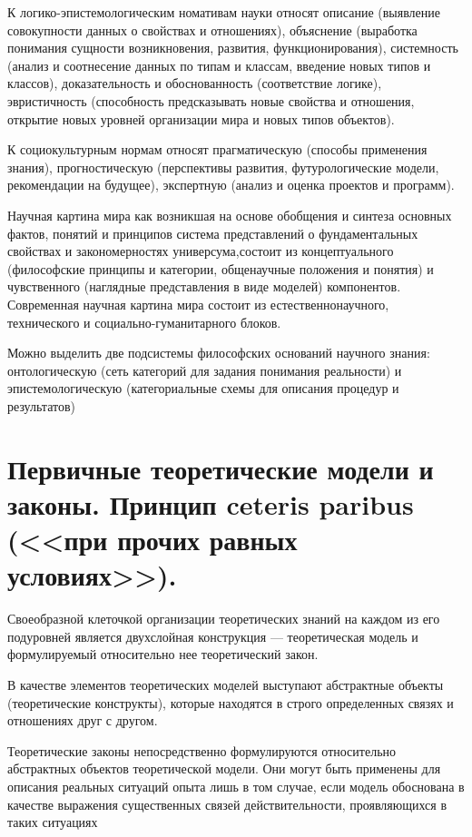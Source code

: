 \documentclass[12pt, specialist, subf, substylefile = spbu.rtx]{disser}
\begin{document}
К логико-эпистемологическим номативам науки относят описание (выявление совокупности данных о свойствах и отношениях), объяснение (выработка понимания сущности возникновения, развития, функционирования), системность (анализ и соотнесение данных по типам и классам, введение новых типов и классов), доказательность и обоснованность (соответствие логике), эвристичность (способность предсказывать новые свойства и отношения, открытие новых уровней организации мира и новых типов объектов).

К социокультурным нормам относят прагматическую (способы применения знания), прогностическую (перспективы развития, футурологические модели, рекомендации на будущее), экспертную (анализ и оценка проектов и программ).

Научная картина мира как возникшая на основе обобщения и синтеза основных фактов, понятий и принципов система представлений о фундаментальных свойствах и закономерностях универсума,состоит из концептуального (философские принципы и категории, общенаучные положения и понятия) и чувственного (наглядные представления в виде моделей) компонентов. Современная научная картина мира состоит из естественнонаучного, технического и социально-гуманитарного блоков.

Можно выделить две подсистемы философских оснований научного знания: онтологическую (сеть категорий для задания понимания реальности) и эпистемологическую (категориальные схемы для описания процедур и результатов)

\section{Первичные теоретические модели и законы. Принцип ceteris paribus (<<при прочих равных условиях>>).}
Своеобразной клеточкой организации теоретических знаний на каждом из его подуровней является двухслойная конструкция — теоретическая модель и формулируемый относительно нее теоретический закон.

В качестве элементов теоретических моделей выступают абстрактные объекты (теоретические конструкты), которые находятся в строго определенных связях и отношениях друг с другом.

Теоретические законы непосредственно формулируются относительно абстрактных объектов теоретической модели. Они могут быть применены для описания реальных ситуаций опыта лишь в том случае, если модель обоснована в качестве выражения существенных связей действительности, проявляющихся в таких ситуациях
\end{document}
